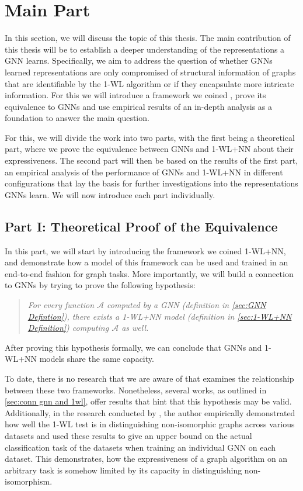 \documentclass[11pt, dvipsnames, DIV=12]{scrreprt}
\theoremstyle{definition}
\newcommand{\wlnn}{\text{1-WL+NN }}
\begin{document}
\section{Main Part}
In this section, we will discuss the topic of this thesis. The main contribution of this thesis will be to establish a deeper understanding of the representations a GNN learns. Specifically, we aim to address the question of whether GNNs learned representations are only compromised of structural information of graphs that are identifiable by the 1-WL algorithm or if they encapsulate more intricate information. For this we will introduce a framework we coined \wlnn, prove its equivalence to GNNs and use empirical results of an in-depth analysis as a foundation to answer the main question.

For this, we will divide the work into two parts, with the first being a theoretical part, where we prove the equivalence between GNNs and 1-WL+NN about their expressiveness. The second part will then be based on the results of the first part, an empirical analysis of the performance of GNNs and 1-WL+NN in different configurations that lay the basis for further investigations into the representations GNNs learn. We will now introduce each part individually.

\subsection{Part I: Theoretical Proof of the Equivalence}
In this part, we will start by introducing the framework we coined 1-WL+NN, and demonstrate how a model of this framework can be used and trained in an end-to-end fashion for graph tasks. More importantly, we will build a connection to GNNs by trying to prove the following hypothesis:

\begin{quote}
\textit{
    For every function $\mathcal{A}$ computed by a GNN (definition in \autoref{sec:GNN Defintion}), there exists a 1-WL+NN model (definition in \autoref{sec:1-WL+NN Definition}) computing $\mathcal{A}$ as well.
}
\end{quote}
After proving this hypothesis formally, we can conclude that GNNs and 1-WL+NN models share the same capacity.

To date, there is no research that we are aware of that examines the relationship between these two
frameworks. Nonetheless, several works, as outlined in \autoref{sec:conn gnn and 1wl}, offer results that hint that this hypothesis may be valid.  Additionally, in the research conducted by \cite{Zopf2022}, the author empirically demonstrated how well the 1-WL test is in distinguishing non-isomorphic graphs across various datasets and used these results to give an upper bound on the actual classification task of the datasets when training an individual GNN on each dataset. This demonstrates, how the expressiveness of a graph algorithm on an arbitrary task is somehow limited by its capacity in distinguishing non-isomorphism.
\end{document}
